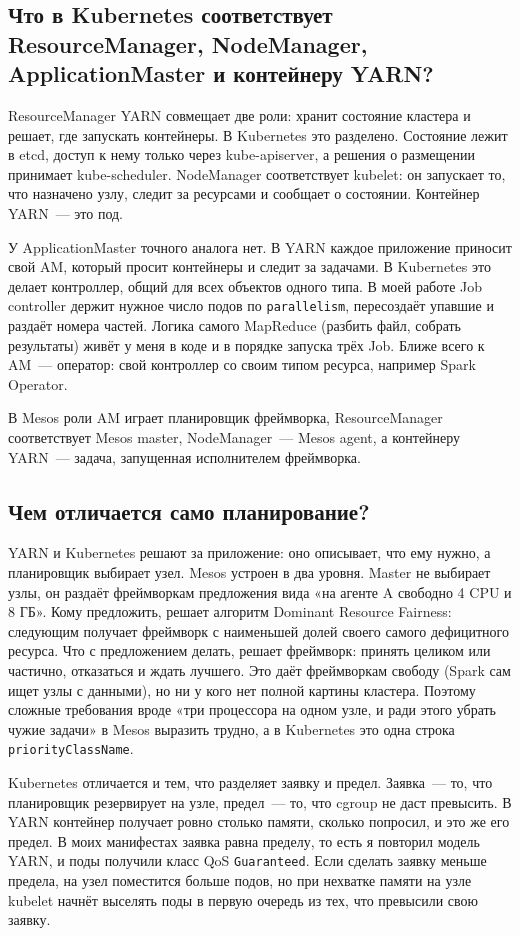 \documentclass[11pt,a4paper]{article}
\begin{document}
\subsection{Что в Kubernetes соответствует ResourceManager, NodeManager, ApplicationMaster и контейнеру YARN?}

ResourceManager YARN совмещает две роли: хранит состояние кластера и решает, где запускать контейнеры. В Kubernetes это разделено. Состояние лежит в etcd, доступ к нему только через kube-apiserver, а решения о размещении принимает kube-scheduler. NodeManager соответствует kubelet: он запускает то, что назначено узлу, следит за ресурсами и сообщает о состоянии. Контейнер YARN~--- это под.

У ApplicationMaster точного аналога нет. В YARN каждое приложение приносит свой AM, который просит контейнеры и следит за задачами. В Kubernetes это делает контроллер, общий для всех объектов одного типа. В моей работе Job controller держит нужное число подов по \texttt{parallelism}, пересоздаёт упавшие и раздаёт номера частей. Логика самого MapReduce (разбить файл, собрать результаты) живёт у меня в коде и в порядке запуска трёх Job. Ближе всего к AM~--- оператор: свой контроллер со своим типом ресурса, например Spark Operator.

В Mesos роли AM играет планировщик фреймворка, ResourceManager соответствует Mesos master, NodeManager~--- Mesos agent, а контейнеру YARN~--- задача, запущенная исполнителем фреймворка.

\subsection{Чем отличается само планирование?}

YARN и Kubernetes решают за приложение: оно описывает, что ему нужно, а планировщик выбирает узел. Mesos устроен в два уровня. Master не выбирает узлы, он раздаёт фреймворкам предложения вида «на агенте A свободно 4 CPU и 8 ГБ». Кому предложить, решает алгоритм Dominant Resource Fairness: следующим получает фреймворк с наименьшей долей своего самого дефицитного ресурса. Что с предложением делать, решает фреймворк: принять целиком или частично, отказаться и ждать лучшего. Это даёт фреймворкам свободу (Spark сам ищет узлы с данными), но ни у кого нет полной картины кластера. Поэтому сложные требования вроде «три процессора на одном узле, и ради этого убрать чужие задачи» в Mesos выразить трудно, а в Kubernetes это одна строка \texttt{priorityClassName}.

Kubernetes отличается и тем, что разделяет заявку и предел. Заявка~--- то, что планировщик резервирует на узле, предел~--- то, что cgroup не даст превысить. В YARN контейнер получает ровно столько памяти, сколько попросил, и это же его предел. В моих манифестах заявка равна пределу, то есть я повторил модель YARN, и поды получили класс QoS \texttt{Guaranteed}. Если сделать заявку меньше предела, на узел поместится больше подов, но при нехватке памяти на узле kubelet начнёт выселять поды в первую очередь из тех, что превысили свою заявку.
\end{document}
